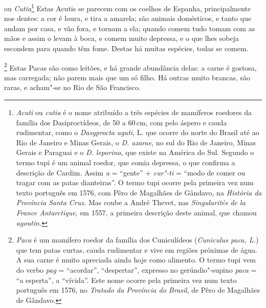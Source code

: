 \begin{linenumbers}
 ou \textit{Cutia}\footnote{ \textit{Acuti} ou
\textit{cutia} é o nome atribuído a três espécies de mamíferos
roedores da família dos Dasiproctídeos, de 50 a 60\,cm, com pelo áspero e
cauda rudimentar, como o \textit{Dasyprocta aguti}, L. que ocorre do
norte do Brasil até ao Rio de Janeiro e Minas Gerais, o \textit{D.
azarae}, no sul do Rio de Janeiro, Minas Gerais e Paraguai e o
\textit{D. leporina}, que existe na América do Sul. Segundo o
termo tupi é um animal roedor, que comia depressa, o que confirma a
descrição de Cardim. Assim \textit{a} = ``gente'' + \textit{cur"-ti} = 
``modo de comer ou tragar com as patas dianteiras''. O termo tupi ocorre
pela primeira vez num texto português em 1576, com Pêro de Magalhães de
Gândavo, na \textit{História da Província Santa Cruz.} Mas coube a
André Thevet, nas \textit{Singularités de la France Antarctique}, em
1557, a primeira descrição deste animal, que chamou
\textit{agoutin.}} Estas Acutis se parecem com os coelhos de
Espanha, principalmente nos dentes: a cor é loura, e tira a amarela;
são animais domésticos, e tanto que andam por casa, e vão fora, e
tornam a ela; quando comem tudo tomam com as mãos e assim o levam à
boca, e comem muito depressa, e o que lhes sobeja escondem para quando
têm fome. Destas há muitas espécies, todas se comem. 

\footnote{ \textit{Paca} é um mamífero
roedor da família dos Cuniculídeos (\textit{Cuniculus paca, L.}) que
tem patas curtas, cauda rudimentar e vive em regiões próximas de água.
A sua carne é muito apreciada ainda hoje como alimento. O termo tupi
vem do verbo \textit{pag} = ``acordar'', ``despertar'', expresso no
gerúndio"-supino \textit{paca} = ``a esperta'', a ``vívida''. Este nome
ocorre pela primeira vez num texto português em 1576, no
\textit{Tratado da Província do Brasil}, de Pêro de Magalhães de Gândavo.}
Estas Pacas são como leitões, e há grande abundância delas:
a carne é gostosa, mas carregada; não parem mais que um só filho. Há
outras muito brancas, são raras, e acham"-se no Rio de São Francisco. 


\end{linenumbers}
